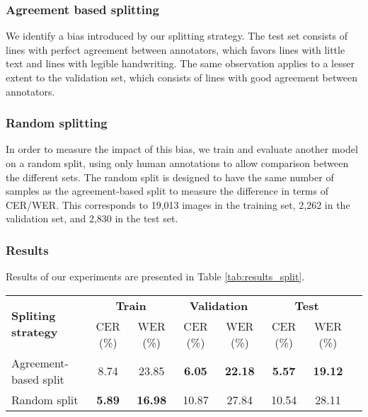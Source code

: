 \documentclass[sigconf]{acmart}
\begin{document}
\subsubsection{Agreement based splitting}
We identify a bias introduced by our splitting strategy. The test set consists of lines with perfect agreement between annotators, which favors lines with little text and lines with legible handwriting. The same observation applies to a lesser extent to the validation set, which consists of lines with good agreement between annotators. 

\subsubsection{Random splitting}
In order to measure the impact of this bias, we train and evaluate another model on a random split, using only human annotations to allow comparison between the different sets. The random split is designed to have the same number of samples as the agreement-based split to measure the difference in terms of CER/WER. This corresponds to 19,013 images in the training set, 2,262 in the validation set, and 2,830 in the test set.


\subsubsection{Results}
Results of our experiments are presented in Table \ref{tab:results_split}.

\begin{table*}[tb]
    \centering
    \caption{Evaluation results using different splitting strategies}
    \label{tab:results_split}
    \begin{tabular}{l|ccccccc}
    \toprule
        \multirow{2}{*}{\bf Spliting strategy} & \multicolumn{2}{c}{\bf Train} &\multicolumn{2}{c}{\bf Validation} & \multicolumn{2}{c}{\bf Test} \\
        & CER (\%) & WER (\%) & CER (\%) & WER (\%) & CER (\%) & WER (\%) \\
    \midrule
        Agreement-based split & 8.74 & 23.85 & \textbf{6.05} & \textbf{22.18} & \textbf{5.57} & \textbf{19.12} \\
        Random split & \textbf{5.89} & \textbf{16.98} & 10.87 & 27.84 & 10.54 & 28.11\\
    \bottomrule
    \end{tabular}
\end{table*}
\end{document}
